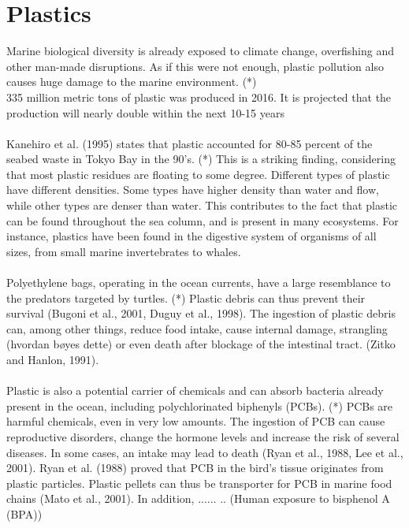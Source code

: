 \section{Plastics}
Marine biological diversity is already exposed to climate change, overfishing and other man-made disruptions. As if this were not enough, plastic pollution also causes huge damage to the marine environment. (*)
\\
335 million metric tons of plastic was produced in 2016. %
It is projected that the production will nearly double within the next 10-15 years
\\\\
Kanehiro et al. (1995) states that plastic accounted for 80-85 percent of the seabed waste in Tokyo Bay in the 90's. (*)
This is a striking finding, considering that most plastic residues are floating to some degree. Different types of plastic have different densities. Some types have higher density than water and flow, while other types are denser than water. This contributes to the fact that plastic can be found throughout the sea column, and is present in many ecosystems. For instance, plastics have been found in the digestive system of organisms of all sizes, from small marine invertebrates to whales.
\\\\
Polyethylene bags, operating in the ocean currents, have a large resemblance to the predators targeted by turtles. (*) Plastic debris can thus prevent their survival (Bugoni et al., 2001, Duguy et al., 1998). The ingestion of plastic debris can, among other things, reduce food intake, cause internal damage, strangling (hvordan bøyes dette) or even death after blockage of the intestinal tract. (Zitko and Hanlon, 1991).
\\\\
Plastic is also a potential carrier of chemicals and can absorb bacteria already present in the ocean, including polychlorinated biphenyls (PCBs). (*) PCBs are harmful chemicals, even in very low amounts. The ingestion of PCB can cause reproductive disorders, change the hormone levels and increase the risk of several diseases. In some cases, an intake may lead to death (Ryan et al., 1988, Lee et al., 2001). Ryan et al. (1988) proved that PCB in the bird's tissue originates from plastic particles. Plastic pellets can thus be transporter for PCB in marine food chains (Mato et al., 2001). In addition, ...... .. (Human exposure to bisphenol A (BPA))
